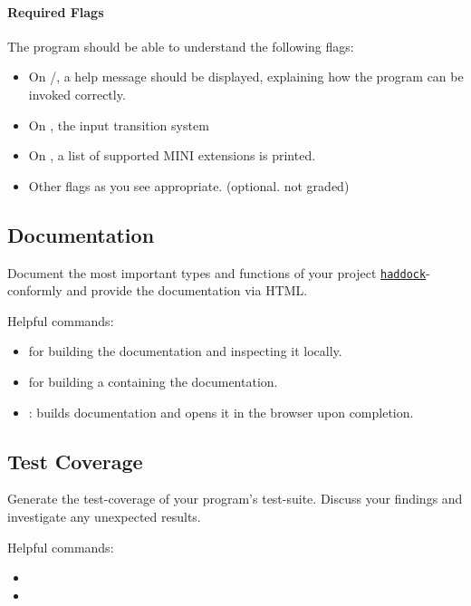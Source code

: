 \documentclass{article}
\begin{document}
\paragraph{Required Flags}

The program should be able to understand the following flags:

\begin{itemize}
\item On /, a help message should be displayed, explaining how the program can be invoked correctly.
\item On , the input transition system
\item On , a list of supported MINI extensions is printed.
\item Other flags as you see appropriate. (optional. not graded)
\end{itemize}

\subsection{Documentation}

Document the most important types and functions of your project \href{https://haskell-haddock.readthedocs.io/en/latest/markup.html}{\texttt{haddock}}-conformly and provide the documentation via HTML.

Helpful commands:

\begin{itemize}
\item {} for building the documentation and inspecting it locally.
\item {} for building a  containing the documentation.
\item {}: builds documentation and opens it in the browser upon completion.
\end{itemize}

\subsection{Test Coverage}

Generate the test-coverage of your program's test-suite.
Discuss your findings and investigate any unexpected results.

Helpful commands:

\begin{itemize}
\item {}
\item {}
\end{itemize}
\end{document}
